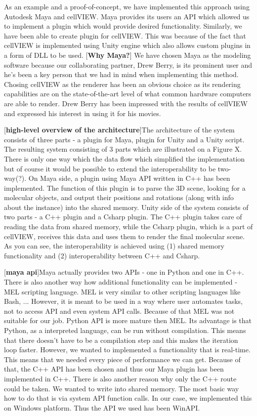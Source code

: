 \documentclass[
  digital, %
  table,   %
  nolof,     %
  nolot,     %
]{fithesis3}
\begin{document}
As an example and a proof-of-concept, we have implemented this approach using Autodesk Maya and cellVIEW. Maya provides its users an API which allowed us to implement a plugin which would provide desired functionality. Similarly, we have been able to create plugin for cellVIEW. This was because of the fact that cellVIEW is implemented using Unity engine which also allows custom plugins in a form of DLL to be used.
[\textbf{Why Maya?}] We have chosen Maya as the modeling software because our collaborating partner, Drew Berry, is its prominent user and he's been a key person that we had in mind when implementing this method. Chosing cellVIEW as the renderer has been an obvious choice as its rendering capabilities are on the state-of-the-art level of what common hardware computers are able to render. Drew Berry has been impressed with the results of cellVIEW and expressed his interest in using it for his movies.

[\textbf{high-level overview of the architecture}]The architecture of the system consists of three parts - a plugin for Maya, plugin for Unity and a Unity script.
The resulting system consisting of 3 parts which are illustrated on a Figure X. There is only one way which the data flow which simplified the implementation but of course it would be possible to extend the interoperability to be two-way(?).
On Maya side, a plugin using Maya API written in C++ has been implemented. The function of this plugin is to parse the 3D scene, looking for a molecular objects, and output their positions and rotations (along with info about the instance) into the shared memory.
Unity side of the system consists of two parts - a C++ plugin and a Csharp plugin. The C++ plugin takes care of reading the data from shared memory, while the Csharp plugin, which is a part of cellVIEW, receives this data and uses them to render the final molecular scene. As you can see, the interoperability is achieved using (1) shared memory functionality and (2) interoperability between C++ and Csharp.

[\textbf{maya api}]Maya actually provides two APIs - one in Python and one in C++. There is also another way how additional functionality can be implemented - MEL scripting language. MEL is very similar to other scripting languages like Bash, ... However, it is meant to be used in a way where user automates tasks, not to access API and even system API calls. Because of that MEL was not suitable for our job. Python API is more mature then MEL. Its advantage is that Python, as a interpreted language, can be run without compilation. This means that there doesn't have to be a compilation step and this makes the iteration loop faster. However, we wanted to implemented a functionality that is real-time. This means that we needed every piece of performance we can get. Because of that, the C++ API has been chosen and thus our Maya plugin has been implemented in C++.
There is also another reason why only the C++ route could be taken. We wanted to write into shared memory. The most basic way how to do that is via system API function calls. In our case, we implemented this on Windows platform. Thus the API we used has been WinAPI.
\end{document}
